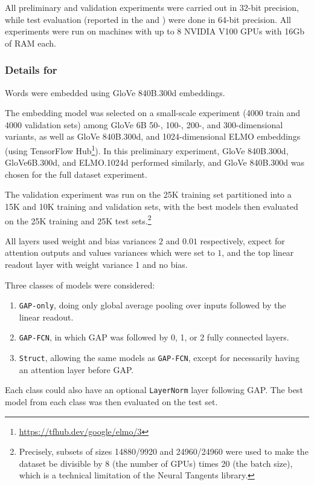     All preliminary and validation experiments were carried out in 32-bit precision, while test evaluation (reported in the  and ) were done in 64-bit precision. All experiments were run on machines with up to 8 NVIDIA V100 GPUs with 16Gb of RAM each.

\subsubsection{Details for }\label{sect:imdb_full_appendix}
    Words were embedded using GloVe 840B.300d embeddings.

    The embedding model was selected on a small-scale experiment (4000 train and 4000 validation sets) among GloVe 6B 50-, 100-, 200-, and 300-dimensional variants, as well as GloVe 840B.300d, and 1024-dimensional ELMO \citep{Peters:2018} embeddings (using TensorFlow Hub\footnote{\url{https://tfhub.dev/google/elmo/3}}). In this preliminary experiment, GloVe 840B.300d, GloVe6B.300d, and ELMO.1024d performed similarly, and GloVe 840B.300d was chosen for the full dataset experiment.
    
    The validation experiment was run on the 25K training set partitioned into a 15K and 10K training and validation sets, with the best models then evaluated on the 25K training and 25K test sets.\footnote{Precisely, subsets of sizes 14880/9920 and 24960/24960 were used to make the dataset be divisible by 8 (the number of GPUs) times 20 (the batch size), which is a technical limitation of the Neural Tangents \citep{novak2020neural} library.}
    
    All layers used weight and bias variances $2$ and $0.01$ respectively, expect for attention outputs and values variances which were set to $1$, and the top linear readout layer with weight variance 1 and no bias.
    
    Three classes of models were considered:
    \begin{enumerate}
        \item \texttt{GAP-only}, doing only global average pooling over inputs followed by the linear readout.
        \item \texttt{GAP-FCN}, in which GAP was followed by 0, 1, or 2 fully connected layers.
        \item \texttt{Struct}, allowing the same models as \texttt{GAP-FCN}, except for necessarily having an attention layer before GAP.
    \end{enumerate}
    Each class could also have an optional \texttt{LayerNorm} layer following GAP. The best model from each class was then evaluated on the test set.

